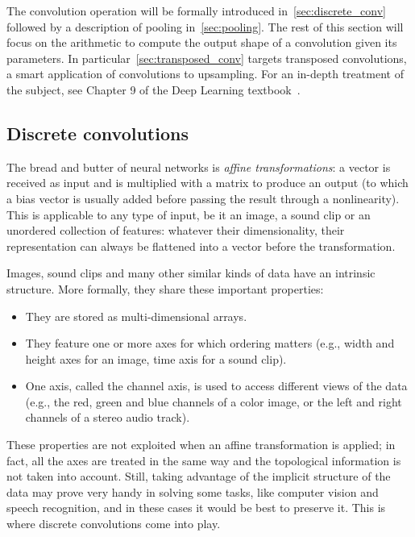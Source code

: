 The convolution operation will be formally introduced
in~\autoref{sec:discrete_conv} followed by a description of pooling
in~\autoref{sec:pooling}. The rest of this section will focus on the arithmetic
to compute the output shape of a convolution given its parameters. In
particular~\autoref{sec:transposed_conv} targets transposed convolutions, a
smart application of convolutions to upsampling. For an in-depth treatment of
the subject, see Chapter 9 of the Deep Learning
textbook~\citep{Goodfellow-et-al-2016-Book}.

\subsection{Discrete convolutions}\label{sec:discrete_conv}

The bread and butter of neural networks is \emph{affine transformations}: a
vector is received as input and is multiplied with a matrix to produce an
output (to which a bias vector is usually added before passing the result
through a nonlinearity). This is applicable to any type of input, be it an
image, a sound clip or an unordered collection of features: whatever their
dimensionality, their representation can always be flattened into a vector
before the transformation.

Images, sound clips and many other similar kinds of data have an intrinsic
structure. More formally, they share these important properties:

\begin{itemize}
    \item They are stored as multi-dimensional arrays.
    \item They feature one or more axes for which ordering matters (e.g., width
        and height axes for an image, time axis for a sound clip).
    \item One axis, called the channel axis, is used to access different views
        of the data (e.g., the red, green and blue channels of a color image, or
        the left and right channels of a stereo audio track).
\end{itemize}

These properties are not exploited when an affine transformation is applied; in
fact, all the axes are treated in the same way and the topological information
is not taken into account. Still, taking advantage of the implicit structure of
the data may prove very handy in solving some tasks, like computer vision and
speech recognition, and in these cases it would be best to preserve it. This is
where discrete convolutions come into play.

